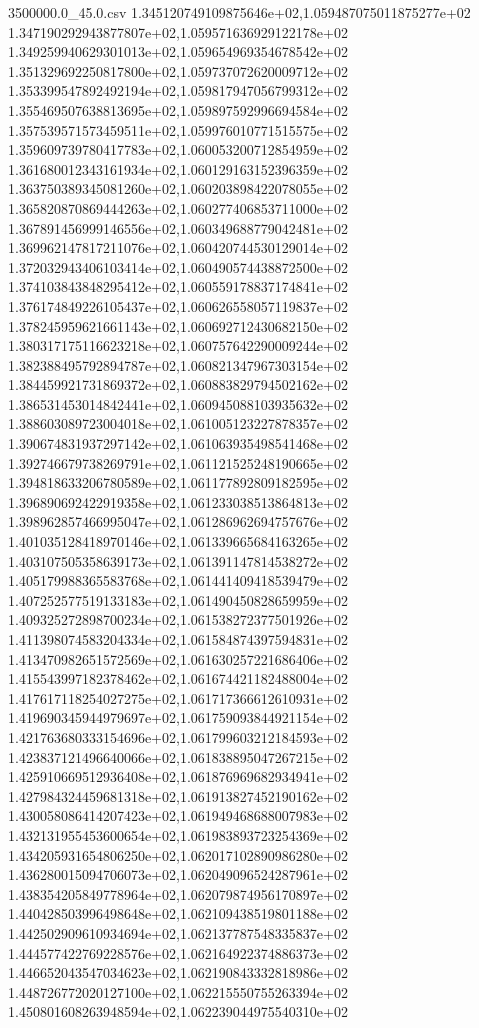 \begin{filecontents*}{3500000.0_45.0.csv}
1.345120749109875646e+02,1.059487075011875277e+02
1.347190292943877807e+02,1.059571636929122178e+02
1.349259940629301013e+02,1.059654969354678542e+02
1.351329692250817800e+02,1.059737072620009712e+02
1.353399547892492194e+02,1.059817947056799312e+02
1.355469507638813695e+02,1.059897592996694584e+02
1.357539571573459511e+02,1.059976010771515575e+02
1.359609739780417783e+02,1.060053200712854959e+02
1.361680012343161934e+02,1.060129163152396359e+02
1.363750389345081260e+02,1.060203898422078055e+02
1.365820870869444263e+02,1.060277406853711000e+02
1.367891456999146556e+02,1.060349688779042481e+02
1.369962147817211076e+02,1.060420744530129014e+02
1.372032943406103414e+02,1.060490574438872500e+02
1.374103843848295412e+02,1.060559178837174841e+02
1.376174849226105437e+02,1.060626558057119837e+02
1.378245959621661143e+02,1.060692712430682150e+02
1.380317175116623218e+02,1.060757642290009244e+02
1.382388495792894787e+02,1.060821347967303154e+02
1.384459921731869372e+02,1.060883829794502162e+02
1.386531453014842441e+02,1.060945088103935632e+02
1.388603089723004018e+02,1.061005123227878357e+02
1.390674831937297142e+02,1.061063935498541468e+02
1.392746679738269791e+02,1.061121525248190665e+02
1.394818633206780589e+02,1.061177892809182595e+02
1.396890692422919358e+02,1.061233038513864813e+02
1.398962857466995047e+02,1.061286962694757676e+02
1.401035128418970146e+02,1.061339665684163265e+02
1.403107505358639173e+02,1.061391147814538272e+02
1.405179988365583768e+02,1.061441409418539479e+02
1.407252577519133183e+02,1.061490450828659959e+02
1.409325272898700234e+02,1.061538272377501926e+02
1.411398074583204334e+02,1.061584874397594831e+02
1.413470982651572569e+02,1.061630257221686406e+02
1.415543997182378462e+02,1.061674421182488004e+02
1.417617118254027275e+02,1.061717366612610931e+02
1.419690345944979697e+02,1.061759093844921154e+02
1.421763680333154696e+02,1.061799603212184593e+02
1.423837121496640066e+02,1.061838895047267215e+02
1.425910669512936408e+02,1.061876969682934941e+02
1.427984324459681318e+02,1.061913827452190162e+02
1.430058086414207423e+02,1.061949468688007983e+02
1.432131955453600654e+02,1.061983893723254369e+02
1.434205931654806250e+02,1.062017102890986280e+02
1.436280015094706073e+02,1.062049096524287961e+02
1.438354205849778964e+02,1.062079874956170897e+02
1.440428503996498648e+02,1.062109438519801188e+02
1.442502909610934694e+02,1.062137787548335837e+02
1.444577422769228576e+02,1.062164922374886373e+02
1.446652043547034623e+02,1.062190843332818986e+02
1.448726772020127100e+02,1.062215550755263394e+02
1.450801608263948594e+02,1.062239044975540310e+02

\end{filecontents*}
